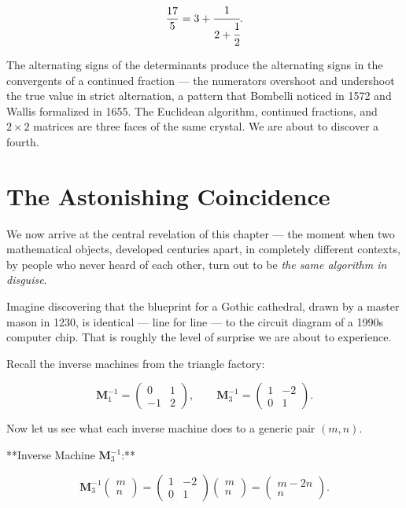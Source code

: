 \[
\frac{17}{5} = 3 + \cfrac{1}{2 + \cfrac{1}{2}}.
\]

The alternating signs of the determinants produce the alternating signs in the convergents of a continued fraction --- the numerators overshoot and undershoot the true value in strict alternation, a pattern that Bombelli noticed in 1572 and Wallis formalized in 1655. The Euclidean algorithm, continued fractions, and $2 \times 2$ matrices are three faces of the same crystal. We are about to discover a fourth.

\bigskip

\section*{The Astonishing Coincidence}

We now arrive at the central revelation of this chapter --- the moment when two mathematical objects, developed centuries apart, in completely different contexts, by people who never heard of each other, turn out to be \textit{the same algorithm in disguise}.

Imagine discovering that the blueprint for a Gothic cathedral, drawn by a master mason in 1230, is identical --- line for line --- to the circuit diagram of a 1990s computer chip. That is roughly the level of surprise we are about to experience.

Recall the inverse machines from the triangle factory:

\[
\mathbf{M}_1^{-1} = \begin{pmatrix} 0 & 1 \\ -1 & 2 \end{pmatrix}, \qquad
\mathbf{M}_3^{-1} = \begin{pmatrix} 1 & -2 \\ 0 & 1 \end{pmatrix}.
\]

Now let us see what each inverse machine does to a generic pair $(m, n)$.

**Inverse Machine $\mathbf{M}_3^{-1}$:**

\[
\mathbf{M}_3^{-1} \begin{pmatrix} m \\ n \end{pmatrix} = \begin{pmatrix} 1 & -2 \\ 0 & 1 \end{pmatrix} \begin{pmatrix} m \\ n \end{pmatrix} = \begin{pmatrix} m - 2n \\ n \end{pmatrix}.
\]

